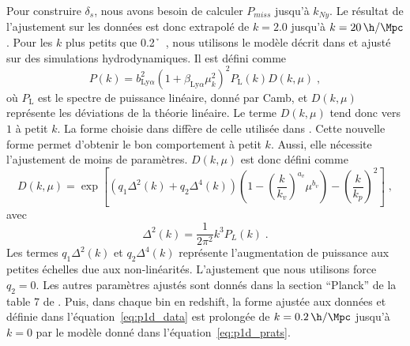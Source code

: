 \documentclass[11pt, twoside, a4paper, openright]{report}
\begin{document}
Pour construire $\delta_s$, nous avons besoin de calculer $P_{miss}$ jusqu'à $k_{Ny}$.
Le résultat de l'ajustement sur les données est donc extrapolé de $k = \num{2.0}$ jusqu'à $k = \SI{20}{\h\per\Mpc}$.
Pour les $k$ plus petits que \SI{0.2}{\h\per\Mpc}, nous utilisons le modèle décrit dans \textcite{Arinyo-i-Prats2015} et ajusté sur des simulations hydrodynamiques.
Il est défini comme
\begin{equation}
  P(k) = b_{\mathrm{Ly}\alpha}^2 (1 + \beta_{\mathrm{Ly}\alpha} \mu_k^2)^2 P_{\mathrm{L}}(k) D(k, \mu) \; ,
\end{equation}
où $P_{\mathrm{L}}$ est le spectre de puissance linéaire, donné par Camb, et $D(k,\mu)$ représente les déviations de la théorie linéaire. Le terme $D(k,\mu)$ tend donc vers $1$ à petit $k$. La forme choisie dans \textcite{Arinyo-i-Prats2015} diffère de celle utilisée dans \textcite{mcdonald_toward_2003}. Cette nouvelle forme permet d'obtenir le bon comportement à petit $k$. Aussi, elle nécessite l'ajustement de moins de paramètres.
$D(k,\mu)$ est donc défini comme
\begin{equation}
  \label{eq:p1d_prats}
  D(k, \mu) = \exp\left[
    \left(q_1 \Delta^2(k) + q_2 \Delta^4(k) \right) \left(1 - \left(\frac{k}{k_v}\right)^{a_v} \mu^{b_v} \right)
    - \left(\frac{k}{k_p} \right)^2 
  \right]
  \; ,
\end{equation}
avec
\begin{equation}
  \Delta^2(k) = \frac{1}{2 \pi^2} k^3 P_L(k) \; .
\end{equation}
Les termes $q_1 \Delta^2(k)$ et $q_2 \Delta^4(k)$ représente l'augmentation de puissance aux petites échelles due aux non-linéarités. L'ajustement que nous utilisons force $q_2 = 0$. Les autres paramètres ajustés sont donnés dans la section ``Planck'' de la table 7 de \textcite{Arinyo-i-Prats2015}.
Puis, dans chaque bin en redshift, la forme ajustée aux données et définie dans l'équation~\ref{eq:p1d_data} est prolongée de $k = \SI{0.2}{\h\per\Mpc}$ jusqu'à $k = 0$ par le modèle donné dans l'équation~\ref{eq:p1d_prats}.
\end{document}
